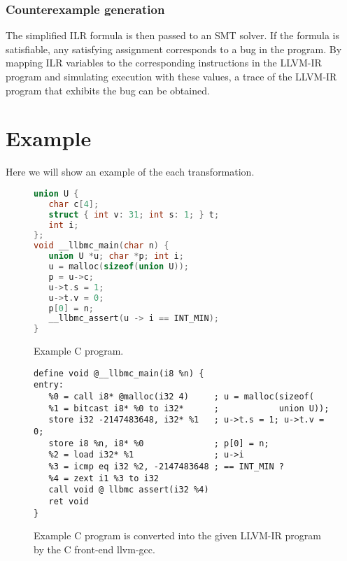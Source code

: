 \documentclass[14pt]{article}
\begin{document}
{  
  \subsubsection*{Counterexample generation}\label{Counterexample generation} The simplified ILR formula is then passed to an SMT solver. If the formula is satisfiable, any satisfying assignment corresponds to a bug in the program. By mapping ILR variables to the corresponding instructions in the LLVM-IR program and simulating execution with these values, a trace of the LLVM-IR program that exhibits the bug can be obtained. 
  
\section{Example}\label{}
Here we will show an example of the each transformation. 

\begin{figure}[ht]
\centering
\begin{minipage}[t]{0.45\linewidth}
\begin{lstlisting}[language=C]
union U {
   char c[4];
   struct { int v: 31; int s: 1; } t;
   int i;
};
void __llbmc_main(char n) {
   union U *u; char *p; int i;
   u = malloc(sizeof(union U));
   p = u->c;
   u->t.s = 1;
   u->t.v = 0;
   p[0] = n;
   __llbmc_assert(u -> i == INT_MIN);
}
\end{lstlisting}
\end{minipage}
\caption{Example C program.}
\end{figure}

\begin{figure}[ht]
\centering
\begin{minipage}[t]{0.85\linewidth}
\begin{lstlisting}
define void @__llbmc_main(i8 %n) {
entry:
   %0 = call i8* @malloc(i32 4)     ; u = malloc(sizeof(
   %1 = bitcast i8* %0 to i32*      ;            union U));
   store i32 -2147483648, i32* %1   ; u->t.s = 1; u->t.v = 0;
   store i8 %n, i8* %0              ; p[0] = n;
   %2 = load i32* %1                ; u->i
   %3 = icmp eq i32 %2, -2147483648 ; == INT_MIN ?
   %4 = zext i1 %3 to i32
   call void @ llbmc assert(i32 %4)
   ret void
}
\end{lstlisting}
\end{minipage}
\caption{Example C program is converted into the given LLVM-IR program by the C front-end llvm-gcc.}
\end{figure}


}
\end{document}

